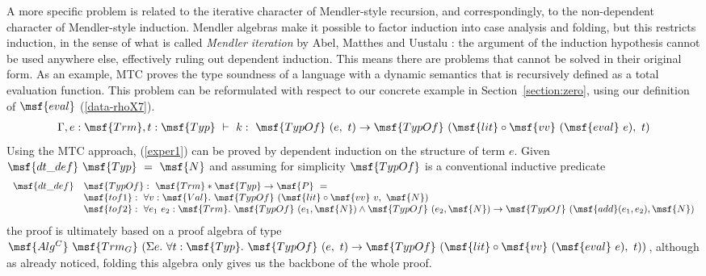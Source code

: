 \documentclass[submission,copyright,creativecommons]{eptcs}
\begin{document}
A more specific problem is related to the iterative character of
Mendler-style recursion, and correspondingly, to the non-dependent
character of Mendler-style induction. Mendler algebras make it
possible to factor induction into case analysis and folding, but this
restricts induction, in the sense of what is called \emph{Mendler
  iteration} by Abel, Matthes and Uustalu \cite{AbelMU05}: the
argument of the induction hypothesis cannot be used anywhere else,
effectively ruling out dependent induction. This means there are
problems that cannot be solved in their original form. As an example,
MTC \cite{Dela13} proves the type soundness of a language with a
dynamic semantics that is recursively defined as a total evaluation
function. This problem can be reformulated with respect to our
concrete example in Section~\ref{section:zero}, using our definition
of $\msf{eval}$ (\ref{data-rhoX7}).
\begin{gather}  \label{exper1}
\Gamma, e: \msf{Trm}, t: \msf{Typ} \ \vdash \ k : \ \msf{TypOf} \ ( e,
\ t) \to \msf{TypOf} \ (\msf{lit} \circ \msf{vv} \ (\msf{eval} \ e),
\ t) \end{gather}
Using the MTC approach, (\ref{exper1}) can be proved by dependent
induction on the structure of term $e$. Given $\msf{dt\_def}
\ \msf{Typ} \ = \ \msf{N} $ and assuming for simplicity $\msf{TypOf}$
is a conventional inductive predicate
\begin{gather}
\begin{array}{lll}
\msf{dt\_def} & \msf{TypOf} : \ \msf{Trm}*\msf{Typ} \to \msf{P} \ =
\\ & \msf{tof1}: \ \forall v:\msf{Val}. \ \msf{TypOf} \ (\msf{lit}
\circ \msf{vv} \ v, \ \msf{N}) \\
& \msf{tof2}: \ \forall e_1 \ e_2: \msf{Trm}. \ \msf{TypOf}
\ (e_1,\msf{N}) \land \msf{TypOf} \ (e_2,\msf{N}) \to \msf{TypOf}
\ (\msf{add}(e_1,e_2), \msf{N})
\end{array}
\end{gather}
the proof is ultimately based on a proof algebra of type $\msf{Alg^C}
\ \msf{Trm_G} \ (\Sigma e. \ \forall t:\msf{Typ}. \ \msf{TypOf} \ (e,
\ t) \to \msf{TypOf} \ (\msf{lit} \circ \msf{vv} \ (\msf{eval} \ e),
\ t) ) $, although as already noticed, folding this algebra only gives
us the backbone of the whole proof.
\end{document}
